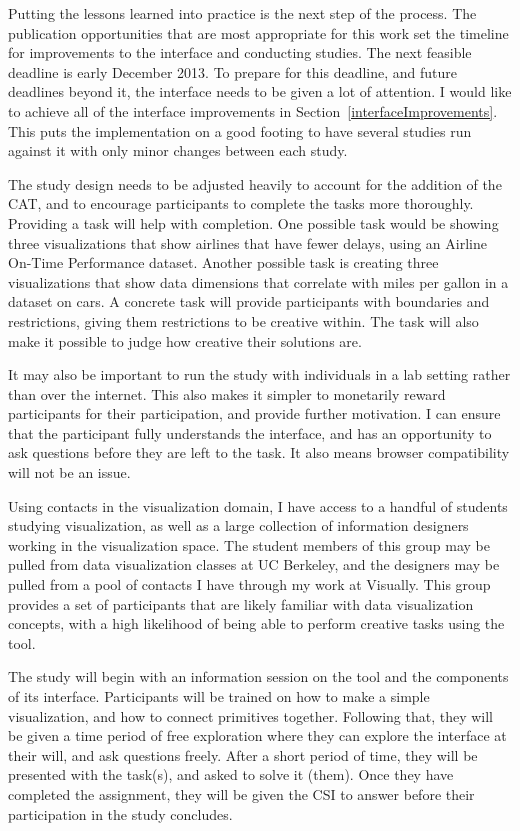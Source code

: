 \label{futureWork}

Putting the lessons learned into practice is the next step of the process.
The publication opportunities that are most appropriate for this work set the timeline for improvements to the interface and conducting studies.
The next feasible deadline is early December 2013.
To prepare for this deadline, and future deadlines beyond it, the interface needs to be given a lot of attention.
I would like to achieve all of the interface improvements in Section~\ref{interfaceImprovements}.
This puts the implementation on a good footing to have several studies run against it with only minor changes between each study.

The study design needs to be adjusted heavily to account for the addition of the CAT, and to encourage participants to complete the tasks more thoroughly.
Providing a task will help with completion.
One possible task would be showing three visualizations that show airlines that have fewer delays, using an Airline On-Time Performance dataset.
Another possible task is creating three visualizations that show data dimensions that correlate with miles per gallon in a dataset on cars.
A concrete task will provide participants with boundaries and restrictions, giving them restrictions to be creative within.
The task will also make it possible to judge how creative their solutions are.

It may also be important to run the study with individuals in a lab setting rather than over the internet.
This also makes it simpler to monetarily reward participants for their participation, and provide further motivation.
I can ensure that the participant fully understands the interface, and has an opportunity to ask questions before they are left to the task.
It also means browser compatibility will not be an issue.

Using contacts in the visualization domain, I have access to a handful of students studying visualization, as well as a large collection of information designers working in the visualization space.
The student members of this group may be pulled from data visualization classes at UC Berkeley, and the designers may be pulled from a pool of contacts I have through my work at Visually.
This group provides a set of participants that are likely familiar with data visualization concepts, with a high likelihood of being able to perform creative tasks using the tool.

The study will begin with an information session on the tool and the components of its interface.
Participants will be trained on how to make a simple visualization, and how to connect primitives together.
Following that, they will be given a time period of free exploration where they can explore the interface at their will, and ask questions freely.
After a short period of time, they will be presented with the task(s), and asked to solve it (them).
Once they have completed the assignment, they will be given the CSI to answer before their participation in the study concludes.

